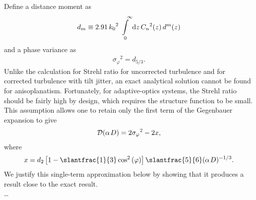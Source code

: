 Define a distance moment as
\begin{eqnarray}d_m\equiv  2.91\,{k_0}^2\int\limits_{\,\,\,
0}^{\,\,\,\,\,\,\infty}{\rm d}z\,{C_n}^2(z)\,d^m(z) \end{eqnarray}
and a phase variance as  \begin{eqnarray}{\sigma _\varphi}^2=d_{5/
3}.\end{eqnarray}    Unlike the calculation for Strehl ratio for
uncorrected  turbulence and for corrected turbulence with tilt
jitter, an exact  analytical solution cannot be found for
anisoplanatism.  Fortunately,  for adaptive-optics systems, the
Strehl ratio should be fairly high by  design, which requires the
structure function to be small.  This  assumption allows one to
retain only the first term of the Gegenbauer  expansion to give
\begin{eqnarray}{\cal D}(\alpha \kern  1ptD)=2{\sigma
_\varphi}^2-2x,\end{eqnarray} where
\begin{eqnarray}x=d_{2}\left[ {1-
{\textstyle{\slantfrac{1}{3}}}\cos ^2\left( \varphi  \right)}
\right]{\slantfrac{5}{6}}(\alpha \kern 1ptD)^{-1/ 3}.\end{eqnarray}
 We justify this single-term approximation below by showing that it
produces a result close to the exact result. \\      \ldots \\


